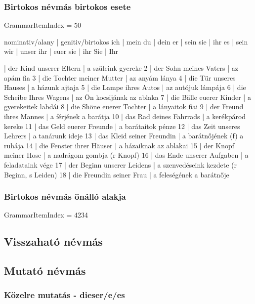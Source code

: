 \documentclass{article}
\newenvironment{desc}{\verbatim}{\endverbatim}
\newenvironment{exmp}{\verbatim}{\endverbatim}
\begin{document}
\subsubsection{Birtokos névmás birtokos esete}

GrammarItemIndex = 50

\begin{desc}
nominativ/alany | genitiv/birtokos 
ich             | mein
du              | dein
er              | sein
sie             | ihr
es              | sein
wir             | unser
ihr             | euer
sie             | ihr
Sie             | Ihr
\end{desc}

\begin{exmp}
1 | der Kind unserer Eltern | a szüleink gyereke
2 | der Sohn meines Vaters | az apám fia
3 | die Tochter meiner Mutter | az anyám lánya
4 | die Tür unseres Hauses | a házunk ajtaja
5 | die Lampe ihres Autos | az autójuk lámpája
6 | die Scheibe Ihres Wagens | az Ön kocsijának az ablaka
7 | die Bälle euerer Kinder | a gyerekeitek labdái
8 | die Shöne euerer Tochter | a lányaitok fiai
9 | der Freund ihres Mannes | a férjének a barátja
10 | das Rad deines Fahrrads | a kerékpárod kereke
11 | das Geld euerer Freunde | a barátaitok pénze
12 | das Zeit unseres Lehrers | a tanárunk ideje
13 | das Kleid seiner Freundin | a barátnőjének (f) a ruhája
14 | die Fenster ihrer Häuser | a házaiknak az ablakai
15 | der Knopf meiner Hose | a nadrágom gombja (r Knopf)
16 | das Ende unserer Aufgaben | a feladataink vége
17 | der Beginn unserer Leidens | a szenvedéseink kezdete (r Beginn, s Leiden)
18 | die Freundin seiner Frau | a feleségének a barátnője
\end{exmp}

\subsubsection{Birtokos névmás önálló alakja}

GrammarItemIndex = 4234

\subsection{Visszaható névmás}

\subsection{Mutató névmás}

\subsubsection{Közelre mutatás - dieser/e/es}
\end{document}
